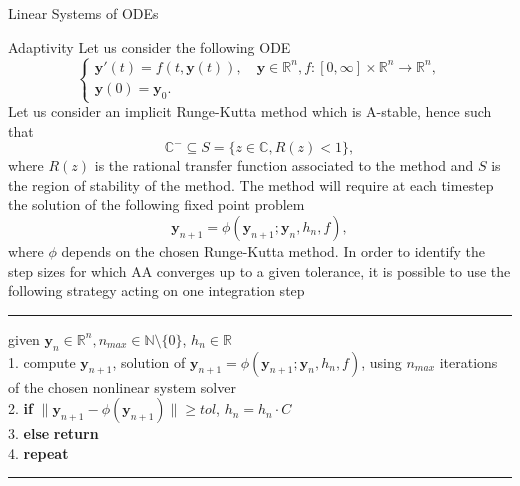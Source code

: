 \documentclass{article}
\begin{document}
\begin{section}{Linear Systems of ODEs}
\begin{subsection}{Adaptivity}\label{subsec:adaptlin}
Let us consider the following ODE
\begin{equation}\label{eq:ode}
	\begin{cases}
		\textbf{y}'(t) = f(t,\textbf{y}(t)), \quad \textbf{y}\in\mathbb{R}^n, f: [0,\infty] \times \mathbb{R}^n \rightarrow \mathbb{R}^n,\\
		\textbf{y}(0) =  \textbf{y}_0.
	\end{cases}
\end{equation}
Let us consider an implicit Runge-Kutta method which is A-stable, hence such that 
\begin{equation*}
 	\mathbb{C}^- \subseteq S = \{ z \in \mathbb{C}, R(z) < 1 \},
\end{equation*}
where $R(z)$ is the rational transfer function associated to the method and $S$ is the region of stability of the method. The method will require at each timestep the solution of the following fixed point problem
\begin{equation}\label{eq:fp}
	\textbf{y}_{n+1} = \phi(\textbf{y}_{n+1}; \textbf{y}_n, h_n, f),
\end{equation} 
where $\phi$ depends on the chosen Runge-Kutta method. In order to identify the step sizes for which AA converges up to a given tolerance, it is possible to use the following strategy acting on one integration step

\noindent\rule{8cm}{0.6pt}

given $\textbf{y}_n \in \mathbb{R}^n, n_{max} \in \mathbb{N}\setminus\{0\} $, $h_n \in \mathbb{R}$\\
1. compute $\textbf{y}_{n+1}$, solution of $\textbf{y}_{n+1} = \phi(\textbf{y}_{n+1}; \textbf{y}_{n}, h_{n}, f)$, using $n_{max}$ iterations of the chosen nonlinear system solver \\
2. \textbf{if} $\|\textbf{y}_{n+1} - \phi(\textbf{y}_{n+1})\| \geq tol$, $ h_{n} = h_{n} \cdot C $ \\
3. \textbf{else} \textbf{return}\\
4. \textbf{repeat} 

\noindent\rule{8cm}{0.6pt}


\end{subsection}
\end{section}
\end{document}
